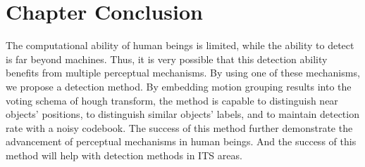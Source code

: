 \section{Chapter Conclusion}
\label{sum4}
The computational ability of human beings is limited, while the ability to detect is far beyond machines. Thus, it is very possible that this detection ability benefits from multiple perceptual mechanisms. By using one of these mechanisms, we propose a detection method. By embedding motion grouping results into the voting schema of hough transform, the method is capable to distinguish near objects' positions, to distinguish similar objects' labels, and to maintain detection rate with a noisy codebook. The success of this method further demonstrate the advancement of perceptual mechanisms in human beings. And the success of this method will help with detection methods in ITS areas.

